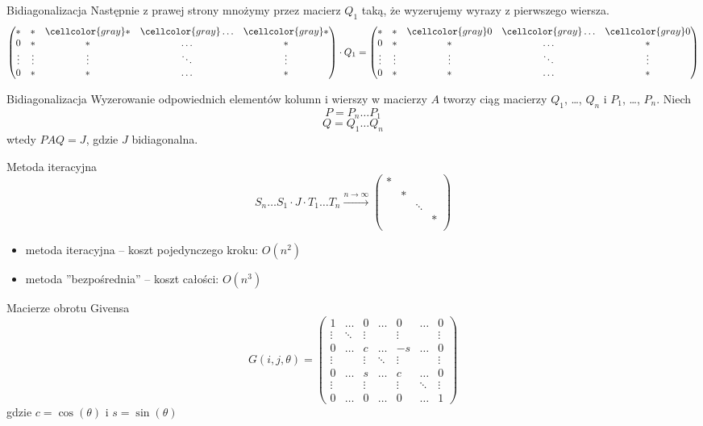 \documentclass{beamer}
\newcommand{\szary}{\cellcolor{gray}}
\begin{document}
\begin{frame}{Bidiagonalizacja}
Następnie z prawej strony mnożymy przez macierz $Q_1$ taką, że wyzerujemy wyrazy z pierwszego wiersza.
$$ \begin{pmatrix} \ast & \ast & \szary \ast & \szary \ldots & \szary \ast \\
0 & \ast & \ast & \ldots & \ast \\
\vdots & \vdots & \vdots & \ddots & \vdots \\
0 & \ast & \ast & \ldots & \ast
\end{pmatrix}
\cdot Q_1 = 
\begin{pmatrix} \ast & \ast & \szary 0 & \szary \ldots & \szary 0 \\
0 & \ast & \ast & \ldots & \ast \\
\vdots & \vdots & \vdots & \ddots & \vdots \\
0 & \ast & \ast & \ldots & \ast
\end{pmatrix}$$
\end{frame}

\begin{frame}{Bidiagonalizacja}
Wyzerowanie odpowiednich elementów kolumn i wierszy w macierzy $A$ tworzy ciąg macierzy $Q_1$, \ldots, $Q_n$ i $P_1$, \ldots, $P_n$.
Niech
$$ P = P_n \ldots P_1 $$
$$ Q = Q_1 \ldots Q_n $$
wtedy $PAQ = J$, gdzie $J$ bidiagonalna.
\end{frame}

\begin{frame}{Metoda iteracyjna}
    $$ S_n \ldots S_1 \cdot J \cdot T_1 \ldots T_n  \xrightarrow{\text{$n \rightarrow\infty$}} \begin{pmatrix}
    \ast & & & \\
    & \ast & & \\
    & & \ddots & \\
    & & & \ast \\
    \end{pmatrix}$$
    
    \begin{itemize}
        \item metoda iteracyjna -- koszt pojedynczego kroku: $O(n^2)$
        \item metoda ''bezpośrednia'' -- koszt całości: $O(n^3)$
    \end{itemize}
\end{frame}

\begin{frame}{Macierze obrotu Givensa}
    $$ G(i,j,\theta) = \begin{pmatrix}
1 & \ldots & 0 & \ldots & 0 & \ldots & 0 \\
\vdots & \ddots & \vdots & & \vdots & & \vdots \\
0 & \ldots & c & \ldots & -s & \ldots & 0 \\
\vdots & & \vdots & \ddots & \vdots & & \vdots \\
0 & \ldots & s & \ldots & c & \ldots & 0 \\
\vdots & & \vdots & & \vdots & \ddots & \vdots \\
0 & \ldots & 0 & \ldots & 0 & \ldots & 1
\end{pmatrix} $$
gdzie $c = \cos( \theta)$ i $ s = \sin (\theta)$
\end{frame}
\end{document}
